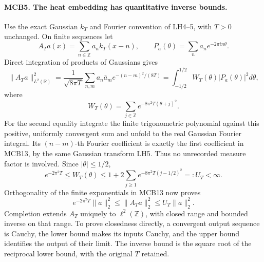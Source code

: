 \paragraph{MCB5. The heat embedding has quantitative inverse bounds.}
Use the exact Gaussian \(k_T\) and Fourier convention of LH4--5,
with \(T>0\) unchanged. On finite sequences let
\[
 A_Ta(x)=\sum_{n\in\mathbb Z}a_nk_T(x-n),\qquad
 P_a(\theta)=\sum_na_ne^{-2\pi i n\theta}.
                                                               \tag{MCB12}
\]
Direct integration of products of Gaussians gives
\[
 \|A_Ta\|_{L^2(\mathbb R)}^2
 =\frac1{\sqrt{8\pi T}}\sum_{n,m}a_n\bar a_m
                   e^{-(n-m)^2/(8T)}
 =\int_{-1/2}^{1/2}W_T(\theta)|P_a(\theta)|^2d\theta,
                                                               \tag{MCB13}
\]
where
\[
 W_T(\theta)=\sum_{j\in\mathbb Z}
                      e^{-8\pi^2T(\theta+j)^2}.
                                                               \tag{MCB14}
\]
For the second equality integrate the finite trigonometric
polynomial against this positive, uniformly convergent sum and
unfold to the real Gaussian Fourier integral. Its \((n-m)\)-th
Fourier coefficient is exactly the first coefficient in MCB13,
by the same Gaussian transform LH5. Thus no unrecorded measure
factor is involved. Since \(|\theta|\le1/2\),
\[
 e^{-2\pi^2T}\le W_T(\theta)
 \le1+2\sum_{j\ge1}e^{-8\pi^2T(j-1/2)^2}=:U_T<\infty.
                                                               \tag{MCB15}
\]
Orthogonality of the finite exponentials in MCB13 now proves
\[
 e^{-2\pi^2T}\|a\|_2^2
 \le\|A_Ta\|_2^2\le U_T\|a\|_2^2 .             \tag{MCB16}
\]
Completion extends \(A_T\) uniquely to \(\ell^2(\mathbb Z)\),
with closed range and bounded inverse on that range. To prove
closedness directly, a convergent output sequence is Cauchy, the
lower bound makes its inputs Cauchy, and the upper bound identifies
the output of their limit. The inverse bound is the square root
of the reciprocal lower bound, with the original \(T\) retained.

